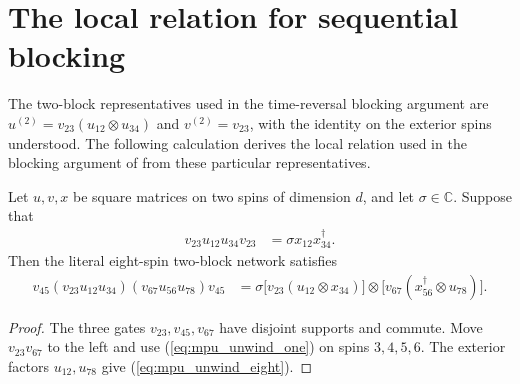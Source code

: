 \section{The local relation for sequential blocking}

The two-block representatives used in the time-reversal blocking argument
are $u^{(2)}=v_{23}(u_{12}\otimes u_{34})$ and $v^{(2)}=v_{23}$, with the
identity on the exterior spins understood. The following calculation
derives the local relation used in the blocking argument of \cite{Cirac2017MPU}
from these particular representatives.

\begin{lemma}\label{lem:mpu_blocking_network}
    \leanok
    Let $u,v,x$ be square matrices on two spins of dimension $d$, and let
    $\sigma\in\mathbb C$. Suppose that
    \begin{align}
        v_{23}u_{12}u_{34}v_{23}
         & =\sigma x_{12}x_{34}^{\dagger}.
        \label{eq:mpu_unwind_one}
    \end{align}
    Then the literal eight-spin two-block network satisfies
    \begin{align}
        v_{45}(v_{23}u_{12}u_{34})(v_{67}u_{56}u_{78})v_{45}
         & =\sigma\bigl[v_{23}(u_{12}\otimes x_{34})\bigr]
        \otimes\bigl[v_{67}(x_{56}^{\dagger}\otimes u_{78})\bigr].
        \label{eq:mpu_unwind_eight}
    \end{align}
\end{lemma}
\begin{proof}\leanok
    The three gates $v_{23},v_{45},v_{67}$ have disjoint supports and commute.
    Move $v_{23}v_{67}$ to the left and use
    (\ref{eq:mpu_unwind_one}) on spins $3,4,5,6$. The exterior factors
    $u_{12},u_{78}$ give (\ref{eq:mpu_unwind_eight}).
\end{proof}


